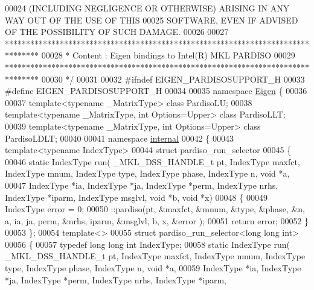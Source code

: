 \begin{DoxyCode}
00024 \textcolor{comment}{ (INCLUDING NEGLIGENCE OR OTHERWISE) ARISING IN ANY WAY OUT OF THE USE OF THIS}
00025 \textcolor{comment}{ SOFTWARE, EVEN IF ADVISED OF THE POSSIBILITY OF SUCH DAMAGE.}
00026 \textcolor{comment}{}
00027 \textcolor{comment}{ ********************************************************************************}
00028 \textcolor{comment}{ *   Content : Eigen bindings to Intel(R) MKL PARDISO}
00029 \textcolor{comment}{ ********************************************************************************}
00030 \textcolor{comment}{*/}
00031 
00032 \textcolor{preprocessor}{#ifndef EIGEN\_PARDISOSUPPORT\_H}
00033 \textcolor{preprocessor}{#define EIGEN\_PARDISOSUPPORT\_H}
00034 
00035 \textcolor{keyword}{namespace }\hyperlink{namespace_eigen}{Eigen} \{ 
00036 
00037 \textcolor{keyword}{template}<\textcolor{keyword}{typename} \_MatrixType> \textcolor{keyword}{class }PardisoLU;
00038 \textcolor{keyword}{template}<\textcolor{keyword}{typename} \_MatrixType, \textcolor{keywordtype}{int} Options=Upper> \textcolor{keyword}{class }PardisoLLT;
00039 \textcolor{keyword}{template}<\textcolor{keyword}{typename} \_MatrixType, \textcolor{keywordtype}{int} Options=Upper> \textcolor{keyword}{class }PardisoLDLT;
00040 
00041 \textcolor{keyword}{namespace }\hyperlink{namespaceinternal}{internal}
00042 \{
00043   \textcolor{keyword}{template}<\textcolor{keyword}{typename} IndexType>
00044   \textcolor{keyword}{struct }pardiso\_run\_selector
00045   \{
00046     \textcolor{keyword}{static} IndexType run( \_MKL\_DSS\_HANDLE\_t pt, IndexType maxfct, IndexType mnum, IndexType type, IndexType
       phase, IndexType n, \textcolor{keywordtype}{void} *a,
00047                       IndexType *ia, IndexType *ja, IndexType *perm, IndexType nrhs, IndexType *iparm, 
      IndexType msglvl, \textcolor{keywordtype}{void} *b, \textcolor{keywordtype}{void} *x)
00048     \{
00049       IndexType error = 0;
00050       ::pardiso(pt, &maxfct, &mnum, &type, &phase, &n, a, ia, ja, perm, &nrhs, iparm, &msglvl, b, x, &error
      );
00051       \textcolor{keywordflow}{return} error;
00052     \}
00053   \};
00054   \textcolor{keyword}{template}<>
00055   \textcolor{keyword}{struct }pardiso\_run\_selector<long long int>
00056   \{
00057     \textcolor{keyword}{typedef} \textcolor{keywordtype}{long} \textcolor{keywordtype}{long} \textcolor{keywordtype}{int} IndexType;
00058     \textcolor{keyword}{static} IndexType run( \_MKL\_DSS\_HANDLE\_t pt, IndexType maxfct, IndexType mnum, IndexType type, IndexType
       phase, IndexType n, \textcolor{keywordtype}{void} *a,
00059                       IndexType *ia, IndexType *ja, IndexType *perm, IndexType nrhs, IndexType *iparm, 

\end{DoxyCode}
